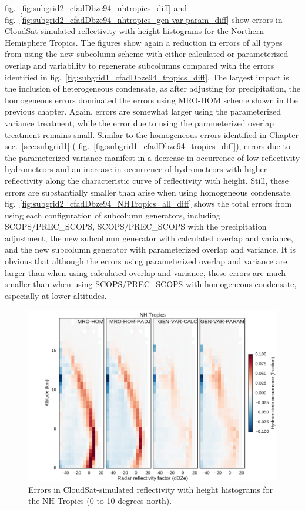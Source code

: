 fig.~\ref{fig:subgrid2_cfadDbze94_nhtropics_diff} and
fig.~\ref{fig:subgrid2_cfadDbze94_nhtropics_gen-var-param_diff} show
errors in CloudSat-simulated reflectivity with height histograms for the
Northern Hemisphere Tropics. The figures show again a reduction in
errors of all types from using the new subcolumn scheme with either
calculated or parameterized overlap and variability to regenerate
subcolumns compared with the errors identified in
fig.~\ref{fig:subgrid1_cfadDbze94_tropics_diff}. The largest impact is
the inclusion of heterogeneous condensate, as after adjusting for
precipitation, the homogeneous errors dominated the errors using MRO-HOM
scheme shown in the previous chapter. Again, errors are somewhat larger
using the parameterized variance treatment, while the error due to using
the parameterized overlap treatment remains small. Similar to the
homogeneous errors identified in Chapter sec.~\ref{sec:subgrid1} (
fig.~\ref{fig:subgrid1_cfadDbze94_tropics_diff}), errors due to the
parameterized variance manifest in a decrease in occurrence of
low-reflectivity hydrometeors and an increase in occurrence of
hydrometeors with higher reflectivity along the characteristic curve of
reflectivity with height. Still, these errors are substantially smaller
than arise when using homogeneous condensate.
fig.~\ref{fig:subgrid2_cfadDbze94_NHTropics_all_diff} shows the total
errors from using each configuration of subcolumn generators, including
SCOPS/PREC\_SCOPS, SCOPS/PREC\_SCOPS with the precipitation adjustment,
the new subcolumn generator with calculated overlap and variance, and
the new subcolumn generator with parameterized overlap and variance. It
is obvious that although the errors using parameterized overlap and
variance are larger than when using calculated overlap and variance,
these errors are much smaller than when using SCOPS/PREC\_SCOPS with
homogeneous condensate, especially at lower-altitudes.

\begin{figure}[htbp]
\centering
\includegraphics{graphics/subgrid2_cfadDbze94_NHTropics_all_diff.pdf}
\caption{\label{fig:subgrid2_cfadDbze94_NHTropics_all_diff}Errors in
CloudSat-simulated reflectivity with height histograms for the NH
Tropics (0 to 10 degrees
north).}\label{fig:subgrid2ux5fcfadDbze94ux5fNHTropicsux5fallux5fdiff}
\end{figure}

